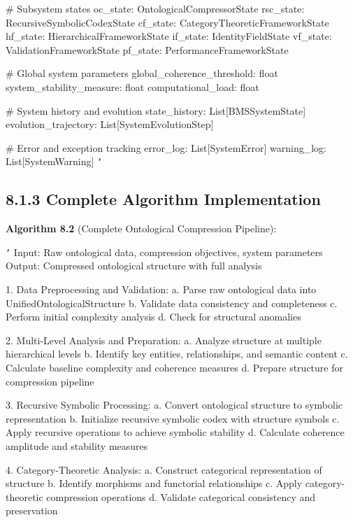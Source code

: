     \# Subsystem states
    oc_state: OntologicalCompressorState
    rsc_state: RecursiveSymbolicCodexState
    cf_state: CategoryTheoreticFrameworkState
    hf_state: HierarchicalFrameworkState
    if_state: IdentityFieldState
    vf_state: ValidationFrameworkState
    pf_state: PerformanceFrameworkState
    
    \# Global system parameters
    global_coherence_threshold: float
    system_stability_measure: float
    computational_load: float
    
    \# System history and evolution
    state_history: List[BMSSystemState]
    evolution_trajectory: List[SystemEvolutionStep]
    
    \# Error and exception tracking
    error_log: List[SystemError]
    warning_log: List[SystemWarning]
\texttt{`}

\subsection{8.1.3 Complete Algorithm Implementation}

\textbf{Algorithm 8.2} (Complete Ontological Compression Pipeline):

\texttt{`}
Input: Raw ontological data, compression objectives, system parameters
Output: Compressed ontological structure with full analysis

1. Data Preprocessing and Validation:
   a. Parse raw ontological data into UnifiedOntologicalStructure
   b. Validate data consistency and completeness
   c. Perform initial complexity analysis
   d. Check for structural anomalies
   
2. Multi-Level Analysis and Preparation:
   a. Analyze structure at multiple hierarchical levels
   b. Identify key entities, relationships, and semantic content
   c. Calculate baseline complexity and coherence measures
   d. Prepare structure for compression pipeline
   
3. Recursive Symbolic Processing:
   a. Convert ontological structure to symbolic representation
   b. Initialize recursive symbolic codex with structure symbols
   c. Apply recursive operations to achieve symbolic stability
   d. Calculate coherence amplitude and stability measures
   
4. Category-Theoretic Analysis:
   a. Construct categorical representation of structure
   b. Identify morphisms and functorial relationships
   c. Apply category-theoretic compression operations
   d. Validate categorical consistency and preservation
   
